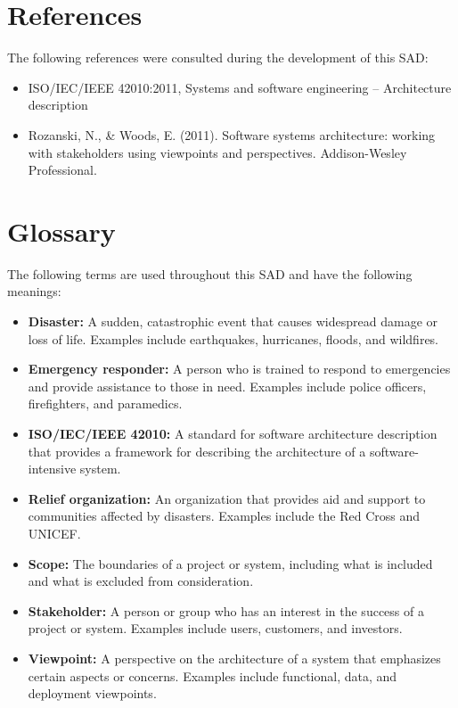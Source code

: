 \documentclass[a4paper]{article}
\begin{document}
    \section{References}
    The following references were consulted during the development of this SAD:
    \begin{itemize}
        \item ISO/IEC/IEEE 42010:2011, Systems and software engineering -- Architecture description
        \item Rozanski, N., \& Woods, E. (2011). Software systems architecture: working with stakeholders using viewpoints and 
        perspectives. Addison-Wesley Professional.
    \end{itemize}

    \section{Glossary}
    The following terms are used throughout this SAD and have the following meanings:
    \begin{itemize}
        \item \textbf{Disaster:} A sudden, catastrophic event that causes widespread damage or loss of life. Examples include 
        earthquakes, hurricanes, floods, and wildfires.
        \item \textbf{Emergency responder:} A person who is trained to respond to emergencies and provide assistance to 
        those in need. Examples include police officers, firefighters, and paramedics.
        \item \textbf{ISO/IEC/IEEE 42010:} A standard for software architecture description that provides a framework for 
        describing the architecture of a software-intensive system.
        \item \textbf{Relief organization:} An organization that provides aid and support to communities affected by disasters. 
        Examples include the Red Cross and UNICEF.
        \item \textbf{Scope:} The boundaries of a project or system, including what is included and what is excluded from
        consideration.
        \item \textbf{Stakeholder:} A person or group who has an interest in the success of a project or system. Examples include
        users, customers, and investors.
        \item \textbf{Viewpoint:} A perspective on the architecture of a system that emphasizes certain aspects or concerns.
        Examples include functional, data, and deployment viewpoints.
    \end{itemize}
\end{document}
